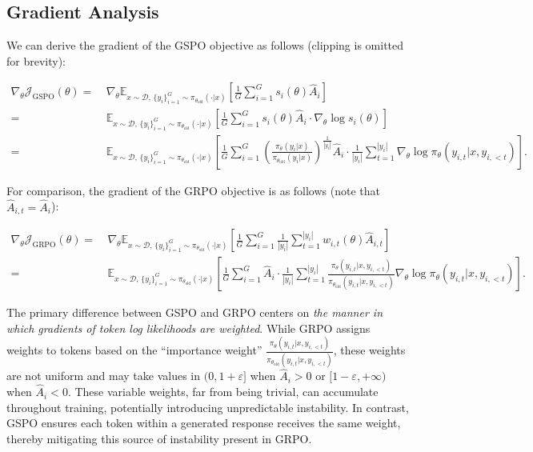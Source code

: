 \subsection{Gradient Analysis}
\label{subsec:gradient}

We can derive the gradient of the GSPO objective as follows (clipping is omitted for brevity):

\begin{align}
\nabla_{\theta} \mathcal{J}_\text{GSPO} (\theta)
=&\ 
\nabla_{\theta} \mathbb{E}_{ x \sim \mathcal{D},\, \{y_i\}_{i=1}^G \sim \pi_{\theta_\text{old}}( \cdot | x) }
\left[ 
\frac{1}{G} \sum_{i=1}^{G} s_{i}(\theta) \widehat{A}_{i}
\right] \\
= &\ 
\mathbb{E}_{ x \sim \mathcal{D},\, \{y_i\}_{i=1}^G \sim \pi_{\theta_\text{old}}( \cdot | x) }
\left[ 
\frac{1}{G} \sum_{i=1}^{G}
s_{i}(\theta) \widehat{A}_{i}
\cdot \nabla_{\theta} \log s_{i}(\theta)
\right] \\
=&\ 
\mathbb{E}_{ x \sim \mathcal{D},\, \{y_i\}_{i=1}^G \sim \pi_{\theta_\text{old}}( \cdot | x) }
\left[ 
\frac{1}{G} \sum_{i=1}^{G} 
\left( \frac{ \pi_{\theta} (y_i | x) }{ \pi_{\theta_\text{old}} (y_i | x)} \right)^{\frac{1}{|y_i|}} \widehat{A}_{i} 
\cdot \frac{1}{|y_i|} \sum_{t=1}^{|y_i|} \nabla_{\theta} \log \pi_{\theta} (y_{i,t} | x, y_{i,<t}) 
\right].
\label{equ:gspo_grad}
\end{align}

For comparison, the gradient of the GRPO objective is as follows (note that $\widehat{A}_{i,t} = \widehat{A}_{i}$):

\begin{align}
\nabla_{\theta} \mathcal{J}_\text{GRPO} (\theta) 
=&\ 
\nabla_{\theta} \mathbb{E}_{ x \sim \mathcal{D},\, \{y_i\}_{i=1}^G \sim \pi_{\theta_\text{old}}( \cdot | x) }
\left[ \frac{1}{G} \sum_{i=1}^{G} \frac{1}{|y_i|} \sum_{t=1}^{|y_i|} 
w_{i,t}(\theta) \widehat{A}_{i,t}
\right] \\
=&\
\mathbb{E}_{ x \sim \mathcal{D},\, \{y_i\}_{i=1}^G \sim \pi_{\theta_\text{old}}( \cdot | x) }
\left[ \frac{1}{G} \sum_{i=1}^{G} \widehat{A}_{i} 
\cdot \frac{1}{|y_i|} \sum_{t=1}^{|y_i|} 
\frac{ \pi_{\theta} (y_{i,t} | x, y_{i,<t}) }{ \pi_{\theta_\text{old}} (y_{i,t} | x,y_{i,<t})} 
\nabla_{\theta} \log \pi_{\theta} (y_{i,t} | x, y_{i,<t})  
\right].
\end{align}

The primary difference between GSPO and GRPO centers on \textit{the manner in which gradients of token log likelihoods are weighted}. While GRPO assigns weights to tokens based on the ``importance weight'' $\frac{ \pi_{\theta} (y_{i,t} | x, y_{i,<t}) }{ \pi_{\theta_\text{old}} (y_{i,t} | x,y_{i,<t})}$, these weights are not uniform and may take values in $(0, 1+\varepsilon]$ when $\widehat{A}_{i} >0$ or $[1-\varepsilon, +\infty)$ when $\widehat{A}_{i} < 0$. These variable weights, far from being trivial, can accumulate throughout training, potentially introducing unpredictable instability. In contrast, GSPO ensures each token within a generated response receives the same weight, thereby mitigating this source of instability present in GRPO.

